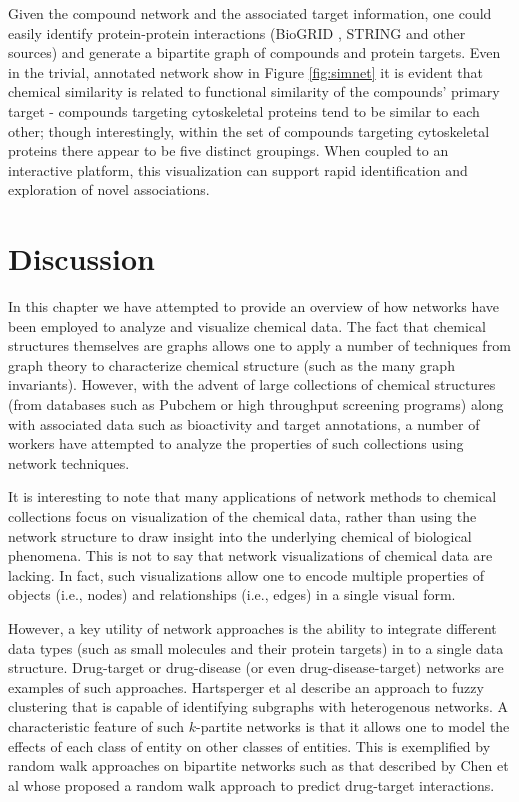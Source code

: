 \documentclass[]{book}
\begin{document}
Given the compound network and the associated target information, one
could easily identify protein-protein interactions (BioGRID
\cite{Chatr-Aryamontri:2015yf}, STRING \cite{Franceschini:2013qa} and
other sources) and generate a bipartite graph of compounds and protein
targets. Even in the trivial, annotated network show in Figure
\ref{fig:simnet} it is evident that chemical similarity is related to
functional similarity of the compounds' primary target - compounds
targeting cytoskeletal proteins tend to be similar to each other;
though interestingly, within the set of compounds targeting
cytoskeletal proteins there appear to be five distinct groupings. When
coupled to an interactive platform, this visualization can support
rapid identification and exploration of novel associations.

\section{Discussion}
\label{sec:summary}

In this chapter we have attempted to provide an overview of how
networks have been employed to analyze and visualize chemical
data. The fact that chemical structures themselves are graphs allows
one to apply a number of techniques from graph theory to characterize
chemical structure (such as the many graph invariants). However, with
the advent of large collections of chemical structures (from databases
such as Pubchem or high throughput screening programs) along with
associated data such as bioactivity and target annotations, a number
of workers have attempted to analyze the properties of such
collections using network techniques.

It is interesting to note that many applications of network methods to
chemical collections focus on visualization of the chemical data,
rather than using the network structure to draw insight into the
underlying chemical of biological phenomena. This is not to say that
network visualizations of chemical data are lacking. In fact, such
visualizations allow one to encode multiple properties of objects
(i.e., nodes) and relationships (i.e., edges) in a single visual form. 

However, a key utility of network approaches is the ability to
integrate different data types (such as small molecules and their
protein targets) in to a single data structure. Drug-target or
drug-disease (or even drug-disease-target) networks are examples of
such approaches. Hartsperger et al \cite{Hartsperger:2010yg} describe
an approach to fuzzy clustering that is capable of identifying
subgraphs with heterogenous networks. A characteristic feature of such
$k$-partite networks is that it allows one to model the effects of
each class of entity on other classes of entities. This is exemplified
by random walk approaches on bipartite networks such as that described
by Chen et al \cite{Chen:2012qy} whose proposed a random walk approach
to predict drug-target interactions.


\end{document}
